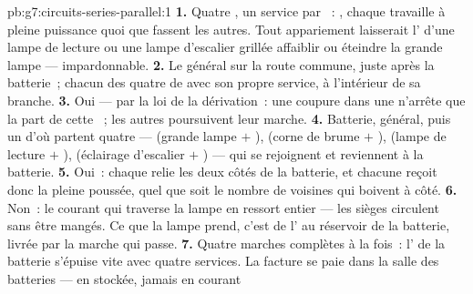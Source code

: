 \begin{solution}{pb:g7:circuits-series-parallel:1}
\textbf{1.} Quatre  , un service par ~:
, chaque  travaille à pleine puissance quoi que
fassent les autres. Tout appariement  laisserait
l' d'une lampe de lecture ou une lampe d'escalier grillée
affaiblir ou éteindre la grande lampe --- impardonnable.
\textbf{2.} Le général sur la route commune, juste après la
batterie~; chacun des quatre  de   avec
son propre service, à l'intérieur de sa branche.
\textbf{3.} Oui --- par la loi de la dérivation~: une coupure dans
une  n'arrête que la part de cette ~; les autres
poursuivent leur marche.
\textbf{4.} Batterie,  général, puis un  d'où partent
quatre  --- (grande lampe $+$ ), (corne de brume
$+$ ), (lampe de lecture $+$ ), (éclairage
d'escalier $+$ ) --- qui se rejoignent et reviennent à la
batterie.
\textbf{5.} Oui~: chaque  relie les deux côtés de la batterie,
et chacune reçoit donc la pleine poussée, quel que soit le nombre de
voisines qui boivent à côté.
\textbf{6.} Non~: le courant qui traverse la lampe en ressort entier
--- les sièges circulent sans être mangés. Ce que la lampe prend,
c'est de l' au réservoir de la batterie, livrée par la marche
qui passe.
\textbf{7.} Quatre marches complètes à la fois~: l' de la
batterie s'épuise vite avec quatre services. La facture se paie dans
la salle des batteries --- en  stockée, jamais en courant

\end{solution}
